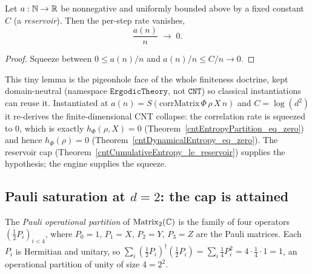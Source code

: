 \begin{theorem}\label{rate_to_zero_of_cumulative_bounded}
  \leanok
  Let \(a:\mathbb{N}\to\mathbb{R}\) be nonnegative and uniformly bounded above by a fixed constant \(C\)
  (a \emph{reservoir}). Then the per-step rate vanishes,
  \[
    \frac{a(n)}{n} \;\longrightarrow\; 0 .
  \]
\end{theorem}
\begin{proof}\leanok
  Squeeze between \(0 \le a(n)/n\) and \(a(n)/n \le C/n \to 0\).
\end{proof}

This tiny lemma is the pigeonhole face of the whole finiteness doctrine, kept domain-neutral
(namespace \(\texttt{ErgodicTheory}\), not \(\texttt{CNT}\)) so classical instantiations can reuse it.
Instantiated at \(a(n) = S(\mathrm{corrMatrix}\,\Phi\,\rho\,X\,n)\) and \(C = \log(d^{2})\) it
re-derives the finite-dimensional CNT collapse: the correlation rate is squeezed to \(0\), which is
exactly \(h_\Phi(\rho,X) = 0\) (Theorem~\ref{cntEntropyPartition_eq_zero}) and hence
\(h_\Phi(\rho) = 0\) (Theorem~\ref{cntDynamicalEntropy_eq_zero}). The reservoir cap
(Theorem~\ref{cntCumulativeEntropy_le_reservoir}) supplies the hypothesis; the engine supplies the
squeeze.

\subsection{Pauli saturation at \(d = 2\): the cap is attained}

\begin{definition}\label{pauliPartition}
  \leanok
  The \emph{Pauli operational partition} of \(\operatorname{Matrix}_2(\mathbb{C})\) is the family of four operators
  \((\tfrac12 P_i)_{i<4}\), where \(P_0 = 1\), \(P_1 = X\), \(P_2 = Y\), \(P_3 = Z\) are the Pauli
  matrices. Each \(P_i\) is Hermitian and unitary, so
  \(\sum_i (\tfrac12 P_i)^{\dagger}(\tfrac12 P_i) = \sum_i \tfrac14 P_i^{2} = 4\cdot\tfrac14\cdot 1 = 1\),
  an operational partition of unity of size \(4 = 2^{2}\).
\end{definition}

